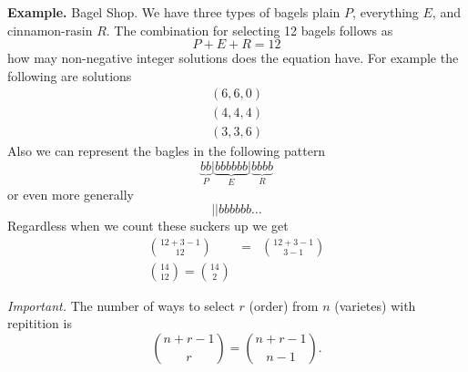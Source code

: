 \documentclass[12pt]{amsart}
\theoremstyle{definition}
\begin{document}
\begin{onehalfspace}
        \noindent\textbf{Example.} Bagel Shop. We have three types of bagels plain $P$, everything $E$, and
        cinnamon-rasin $R$. The combination for selecting 12 bagels follows as
        \begin{displaymath}
            P + E + R = 12
        \end{displaymath}
        how may non-negative integer solutions does the equation have. For example the following are solutions
        \begin{eqnarray*}
            (6, 6, 0) \\
            (4, 4, 4) \\
            (3, 3, 6)
        \end{eqnarray*}
        Also we can represent the bagles in the following pattern
        \begin{displaymath}
            \underbrace{bb}_{P} \Bigg\vert \underbrace{bbbbbb}_{E} \Bigg\vert \underbrace{bbbb}_{R}
        \end{displaymath}
        or even more generally
        \begin{displaymath}
            \vert\vert bbbbbb \ldots
        \end{displaymath}
        Regardless when we count these suckers up we get
        \begin{eqnarray*}
            \binom{12 + 3 - 1}{12} & = & \binom{12 + 3 - 1}{3 - 1} \\
            \binom{14}{12} = \binom{14}{2}
        \end{eqnarray*}

        \emph{Important.} The number of ways to select $r$ (order) from $n$ (varietes) with repitition is
        \begin{displaymath}
            \binom{n + r - 1}{r} = \binom{n + r - 1}{n-1}.
        \end{displaymath}

    \end{onehalfspace}
\end{document}
